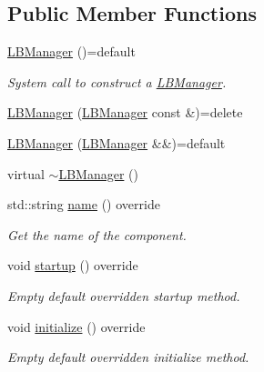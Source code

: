 \subsection*{Public Member Functions}
\begin{DoxyCompactItemize}
\item 
\hyperlink{structvt_1_1vrt_1_1collection_1_1balance_1_1_l_b_manager_a4adad6931af7d5ff2cb983859ed939f3}{L\+B\+Manager} ()=default
\begin{DoxyCompactList}\small\item\em System call to construct a {\ttfamily \hyperlink{structvt_1_1vrt_1_1collection_1_1balance_1_1_l_b_manager}{L\+B\+Manager}}. \end{DoxyCompactList}\item 
\hyperlink{structvt_1_1vrt_1_1collection_1_1balance_1_1_l_b_manager_af361eb6d3fa35d04873fcbe74b315d4a}{L\+B\+Manager} (\hyperlink{structvt_1_1vrt_1_1collection_1_1balance_1_1_l_b_manager}{L\+B\+Manager} const \&)=delete
\item 
\hyperlink{structvt_1_1vrt_1_1collection_1_1balance_1_1_l_b_manager_ab5efdf949166922f70cb49d171bf509a}{L\+B\+Manager} (\hyperlink{structvt_1_1vrt_1_1collection_1_1balance_1_1_l_b_manager}{L\+B\+Manager} \&\&)=default
\item 
virtual \hyperlink{structvt_1_1vrt_1_1collection_1_1balance_1_1_l_b_manager_aacec3c4ef45a173eae443722b2620d13}{$\sim$\+L\+B\+Manager} ()
\item 
std\+::string \hyperlink{structvt_1_1vrt_1_1collection_1_1balance_1_1_l_b_manager_a8e18e972cf9e8658da9577d45e090698}{name} () override
\begin{DoxyCompactList}\small\item\em Get the name of the component. \end{DoxyCompactList}\item 
void \hyperlink{structvt_1_1vrt_1_1collection_1_1balance_1_1_l_b_manager_add5427abf4c6e21e39f581635997ddac}{startup} () override
\begin{DoxyCompactList}\small\item\em Empty default overridden startup method. \end{DoxyCompactList}\item 
void \hyperlink{structvt_1_1vrt_1_1collection_1_1balance_1_1_l_b_manager_a9b9c6fb3aef5efb81465cae39ce3bd06}{initialize} () override
\begin{DoxyCompactList}\small\item\em Empty default overridden initialize method. \end{DoxyCompactList}\item 

\end{DoxyCompactItemize}
